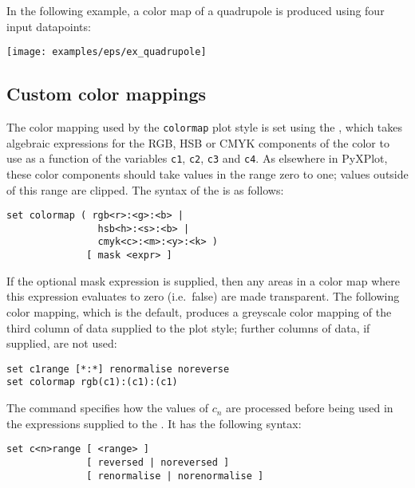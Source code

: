 In the following example, a color map of a quadrupole is produced using four
input datapoints:

\vspace{2mm}

\vspace{2mm}
\centerline{\texttt{[image: examples/eps/ex\_quadrupole]}}

\subsection{Custom color mappings}

The color mapping used by the {\tt colormap} plot style is set using the
, which takes algebraic expressions for the RGB, HSB or
CMYK components of the color to use as a function of the variables {\tt c1},
{\tt c2}, {\tt c3} and {\tt c4}. As elsewhere in PyXPlot, these color
components should take values in the range zero to one; values outside of this
range are clipped.  The syntax of the  is as follows:

\begin{verbatim}
set colormap ( rgb<r>:<g>:<b> |
                hsb<h>:<s>:<b> |
                cmyk<c>:<m>:<y>:<k> )
              [ mask <expr> ]
\end{verbatim}

\noindent If the optional mask expression is supplied, then any areas in a
color map where this expression evaluates to zero (i.e.\ false) are made
transparent. The following color mapping, which is the default, produces a
greyscale color mapping of the third column of data supplied to the
 plot style; further columns of data, if supplied, are not
used:

\begin{verbatim}
set c1range [*:*] renormalise noreverse
set colormap rgb(c1):(c1):(c1)
\end{verbatim}

The  command specifies how the values of $c_n$ are
processed before being used in the expressions supplied to the . It has the following syntax:

\begin{verbatim}
set c<n>range [ <range> ]
              [ reversed | noreversed ]
              [ renormalise | norenormalise ]
\end{verbatim}

